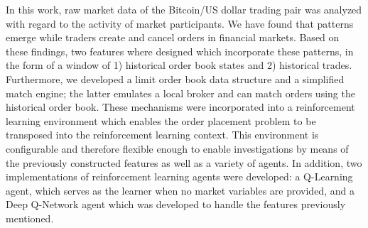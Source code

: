 In this work, raw market data of the Bitcoin/US dollar trading pair was analyzed with regard to the activity of market participants.
We have found that patterns emerge while traders create and cancel orders in financial markets.
Based on these findings, two features where designed which incorporate these patterns, in the form of a window of 1) historical order book states and 2) historical trades.
Furthermore, we developed a limit order book data structure and a simplified match engine; the latter emulates a local broker and can match orders using the historical order book.
These mechanisms were incorporated into a reinforcement learning environment which enables the order placement problem to be transposed into the reinforcement learning context.
This environment is configurable and therefore flexible enough to enable investigations by means of the previously constructed features as well as a variety of agents.
In addition, two implementations of reinforcement learning agents were developed: a Q-Learning agent, which serves as the learner when no market variables are provided, and a Deep Q-Network agent which was developed to handle the features previously mentioned.


